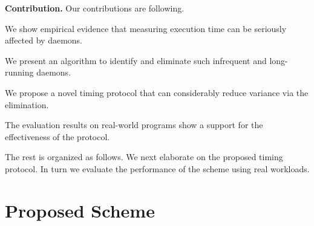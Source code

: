 \documentclass[letter]{ieice}
\begin{document}
\vspace{0.05in}
{\bf Contribution.} 
Our contributions are following.
\vspace{-0.05in}
\begin{itemize}

\item We show empirical evidence that 
measuring execution time 
can be seriously affected by daemons.


{\color{blue}
%

\item We present an algorithm to identify and eliminate such infrequent and long-running 
daemons.

\item We propose a novel timing protocol that can considerably 
reduce variance via the elimination. 

\item The evaluation results on real-world programs 
show a support for the effectiveness of the protocol. 
}

\end{itemize}
\vspace{-0.2in}

\noindent
The rest is organized as follows. 
We next elaborate on the proposed timing protocol. In turn we evaluate the performance of the scheme using real workloads. 

\section{Proposed Scheme}
\label{sec:prop_appach}
\end{document}
